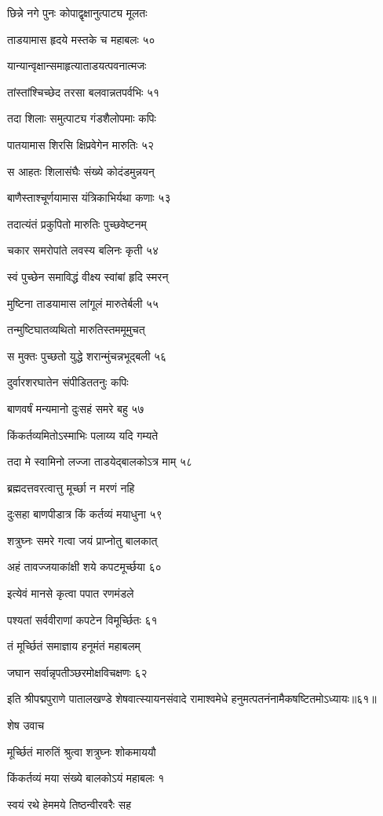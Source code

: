 छिन्ने नगे पुनः कोपाद्वृक्षानुत्पाट्य मूलतः

ताडयामास हृदये मस्तके च महाबलः ५०

यान्यान्वृक्षान्समाहृत्याताडयत्पवनात्मजः

तांस्तांश्चिच्छेद तरसा बलवान्नतपर्वभिः ५१

तदा शिलाः समुत्पाट्य गंडशैलोपमाः कपिः

पातयामास शिरसि क्षिप्रवेगेन मारुतिः ५२

स आहतः शिलासंघैः संख्ये कोदंडमुन्नयन्

बाणैस्ताश्चूर्णयामास यंत्रिकाभिर्यथा कणाः ५३

तदात्यंतं प्रकुपितो मारुतिः पुच्छवेष्टनम्

चकार समरोपांते लवस्य बलिनः कृती ५४

स्वं पुच्छेन समाविद्धं वीक्ष्य स्वांबां हृदि स्मरन्

मुष्टिना ताडयामास लांगूलं मारुतेर्बली ५५

तन्मुष्टिघातव्यथितो मारुतिस्तममूमुचत्

स मुक्तः पुच्छतो युद्धे शरान्मुंचन्नभूद्बली ५६

दुर्वारशरघातेन संपीडिततनुः कपिः

बाणवर्षं मन्यमानो दुःसहं समरे बहु ५७

किंकर्तव्यमितोऽस्माभिः पलाय्य यदि गम्यते

तदा मे स्वामिनो लज्जा ताडयेद्बालकोऽत्र माम् ५८

ब्रह्मदत्तवरत्वात्तु मूर्च्छा न मरणं नहि

दुःसहा बाणपीडात्र किं कर्तव्यं मयाधुना ५९

शत्रुघ्नः समरे गत्वा जयं प्राप्नोतु बालकात्

अहं तावज्जयाकांक्षी शये कपटमूर्च्छया ६०

इत्येवं मानसे कृत्वा पपात रणमंडले

पश्यतां सर्ववीराणां कपटेन विमूर्च्छितः ६१

तं मूर्च्छितं समाज्ञाय हनूमंतं महाबलम्

जघान सर्वान्नृपतीञ्छरमोक्षविचक्षणः ६२

इति श्रीपद्मपुराणे पातालखण्डे शेषवात्स्यायनसंवादे रामाश्वमेधे हनुमत्पतनंनामैकषष्टितमोऽध्यायः॥६१॥


शेष उवाच

मूर्च्छितं मारुतिं श्रुत्वा शत्रुघ्नः शोकमाययौ

किंकर्तव्यं मया संख्ये बालकोऽयं महाबलः १

स्वयं रथे हेममये तिष्ठन्वीरवरैः सह


